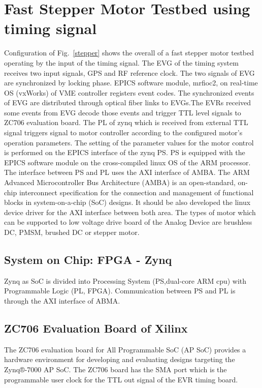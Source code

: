 \documentclass[a4paper,
              ]{jacow}
\begin{document}
\section{Fast Stepper Motor Testbed using timing signal}
Configuration of Fig.~\ref{stepper} shows the overall of a fast stepper motor testbed operating by the input of the timing signal. The EVG of the timing system receives two input signals, GPS and RF reference clock. The two signals of EVG are synchronized by locking phase. EPICS software module, mrfioc2, on real-time OS (vxWorks) of VME controller registers event codes. The synchronized events of EVG are distributed through optical fiber links to EVGs.The EVRs received some events from EVG decode those events and trigger TTL level signals to ZC706 evaluation board. The PL of zynq which is received from external TTL signal triggers signal to motor controller according to the configured motor's operation parameters. The setting of the parameter values for the motor control is performed on the EPICS interface of the zynq PS. PS is equipped with the EPICS software module on the cross-compiled linux OS of the ARM processor. The interface between PS and PL uses the AXI interface of AMBA. The ARM Advanced Microcontroller Bus Architecture (AMBA)\cite{amba-bus} is an open-standard, on-chip interconnect specification for the connection and management of functional blocks in system-on-a-chip (SoC) designs. It should be also developed the linux device driver for the AXI interface between both area. The types of motor which can be supported to low voltage drive board of the Analog Device\cite{analog} are brushless DC, PMSM, brushed DC or stepper motor. 

\subsection{System on Chip: FPGA - Zynq}
Zynq\cite{xilix,zynq} as SoC is divided into Processing System (PS,dual-core ARM cpu) with  Programmable Logic (PL, FPGA). Communication between PS and PL is through the AXI interface of ABMA.

\subsection{ZC706 Evaluation Board of Xilinx}
The ZC706 evaluation board for All Programmable SoC (AP SoC) provides a hardware environment for developing and evaluating designs targeting the Zynq®-7000 AP SoC.\cite{zc706-doc} The ZC706 board has the SMA port which is the programmable user clock for the TTL out signal of the EVR timing board.
\end{document}
